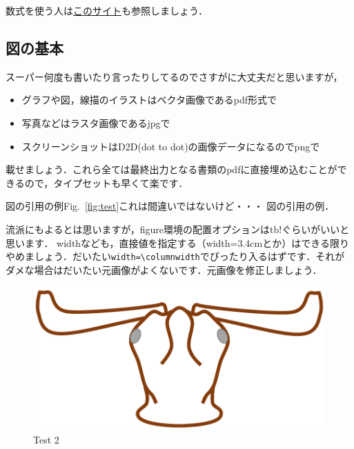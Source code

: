 \documentclass[platex,dvipdfmx]{jlreq}%
\numberwithin{equation}{section}%
\begin{document}
数式を使う人は\href{http://www.math.tohoku.ac.jp/~kuroki/LaTeX/howtolatex.html}{このサイト}も参照しましょう．


\subsection{図の基本}

スーパー何度も書いたり言ったりしてるのでさすがに大丈夫だと思いますが，
\begin{itemize}
 \item グラフや図，線描のイラストはベクタ画像であるpdf形式で
 \item 写真などはラスタ画像であるjpgで
 \item スクリーンショットはD2D(dot to dot)の画像データになるのでpngで
\end{itemize}
載せましょう．これら全ては最終出力となる書類のpdfに直接埋め込むことができるので，タイプセットも早くて楽です．

図の引用の例Fig.~\ref{fig:test}これは間違いではないけど・・・
図の引用の例．%

流派にもよるとは思いますが，figure環境の配置オプションはtb!ぐらいがいいと思います．
widthなども，直接値を指定する（width=3.4cmとか）はできる限りやめましょう．だいたい\verb#width=\columnwidth#でぴったり入るはずです．それがダメな場合はだいたい元画像がよくないです．元画像を修正しましょう．

\begin{figure}[tb]
 \centering %
  \includegraphics[width=\columnwidth]{./figure/testfig2.pdf}
  \caption{Test 2}
  \label{fig:test2}
\end{figure}
\fi%
\end{document}
